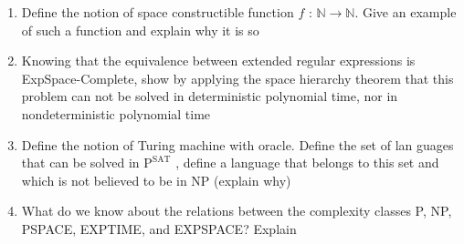 \documentclass{article}
\begin{document}
\begin{enumerate}{}

\item Define the notion of space constructible function $f \text{ : } \mathbb{N} \rightarrow \mathbb{N}$. Give an example of such a function and explain why it is so

\item Knowing that the equivalence between extended regular expressions is ExpSpace-Complete, show by applying the space hierarchy theorem that this problem can not be solved in deterministic polynomial time, nor in nondeterministic polynomial time

\item Define the notion of Turing machine with oracle. Define the set of lan guages that can be solved in $\text{P}^\text{SAT}$ , define a language that belongs to this set and which is not believed to be in NP (explain why)

\item What do we know about the relations between the complexity classes P, NP, PSPACE, EXPTIME, and EXPSPACE? Explain


\end{enumerate}


%
%
\end{document}
